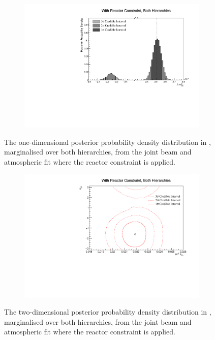 \begin{figure}[h]
  \begin{subfigure}[t]{0.98\textwidth}
    \includegraphics[width=\textwidth, trim={0mm 0mm 0mm 0mm}, clip,page=1]{Figures/OA/JointFit_wRC/Contours_1D_dm32_BH_1_wRC_UnSmeared_CredibleInterval.pdf}
  \end{subfigure}
  \caption{The one-dimensional posterior probability density distribution in , marginalised over both hierarchies, from the joint beam and atmospheric fit where the reactor constraint is applied.}
  \label{fig:OscillationAnalysis_JointFit_wRC_DM32}
\end{figure}

\begin{figure}[h]
  \begin{subfigure}[t]{0.98\textwidth}
    \includegraphics[width=\textwidth, trim={0mm 0mm 0mm 0mm}, clip,page=1]{Figures/OA/JointFit_wRC/Contours_2D_th13_dcp_BH_1_wRC_UnSmeared_CredibleInterval.pdf}
  \end{subfigure}
  \caption{The two-dimensional posterior probability density distribution in , marginalised over both hierarchies, from the joint beam and atmospheric fit where the reactor constraint is applied.}
  \label{fig:OscillationAnalysis_JointFit_wRC_TH13DCP}
\end{figure}

